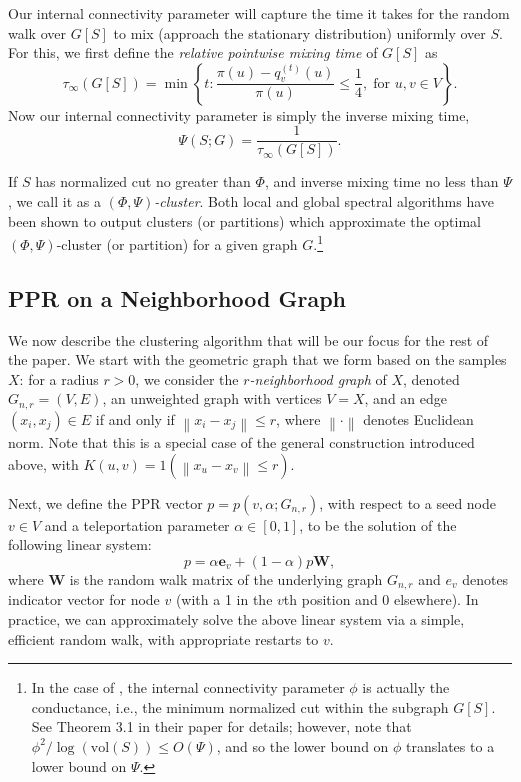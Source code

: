 \documentclass{article}
\newcommand{\set}[1]{\left\{#1\right\}}
\newcommand{\vol}{\mathrm{vol}}
\newcommand{\norm}[1]{\left\lVert#1\right\rVert}
\newcommand{\1}{\mathbf{1}}
\newcommand{\pbf}{p}        %
\newcommand{\qbf}{\mathbf{q}}
\newcommand{\ebf}[1]{\mathbf{e}_{#1}}
\newcommand{\Xbf}{X}             %
\newcommand{\Wbf}{\mathbf{W}}
\theoremstyle{aldenthm}
\theoremstyle{aldenrmrk}
\begin{document}
Our internal connectivity parameter will capture the time it takes for the
random walk over $G[S]$ to mix (approach the stationary distribution)
uniformly over $S$.  For this, we first define the \emph{relative pointwise mixing
  time} of $G[S]$ as 
$$
\tau_{\infty}(G[S]) = \min\set{ t: \frac{\pi(u) - q_{v}^{(t)}(u)
	}{\pi(u)} \leq \frac{1}{4}, 
	\; \text{for $u,v \in V$}}. 
$$
Now our internal connectivity parameter is simply the inverse mixing time, 
\begin{equation}
\label{eqn: inv_mixing_time}
\Psi(S; G) = \frac{1}{\tau_{\infty}(G[S])}.
\end{equation}

If $S$ has normalized cut no greater than $\Phi$, and inverse mixing time no
less than $\Psi$, we call it as a \emph{$(\Phi,\Psi)$-cluster}. Both
local \citep{zhu2013} and global \citep{kannan04} spectral algorithms have been
shown to output clusters (or partitions) which approximate the optimal $(\Phi,
\Psi)$-cluster (or partition) for a given graph $G$.\footnote{In the case of
  \citep{kannan04}, the internal connectivity parameter $\phi$ is actually the
  conductance, i.e., the minimum normalized cut within the subgraph $G[S]$. See
  Theorem 3.1 in their paper for details; however, note that $\phi^2 /
  \log(\vol(S)) \leq O(\Psi)$, and so the lower bound on $\phi$ translates to a
  lower bound on $\Psi$.}   

\subsection{PPR on a Neighborhood Graph}

We now describe the clustering algorithm that will be our focus for the rest of 
the paper. We start with the geometric graph that we form based on the samples 
$\Xbf$: for a radius $r > 0$, we consider the \emph{$r$-neighborhood graph} of 
$\Xbf$, denoted $G_{n,r}=(V,E)$, an unweighted graph with vertices
$V=\Xbf$, and an edge $(x_i,x_j) \in E$ if and only if $\norm{x_i - x_j}
\leq  r$, where $\norm{\cdot}$ denotes Euclidean norm.  Note that this is a
special case of the general construction introduced above, with 
$K(u,v) = 1(\norm{x_u - x_v} \leq r)$. 

Next, we define the PPR vector $\pbf = \pbf(v,\alpha;G_{n,r})$, with respect to  
a seed node $v \in V$ and a teleportation parameter $\alpha \in [0,1]$, to be
the solution of the following linear system:
\begin{equation}
\label{eqn: ppr_vector}
\pbf = \alpha \ebf{v} + (1 - \alpha) \pbf \Wbf,
\end{equation}
where $\Wbf$ is the random walk matrix of the underlying graph $G_{n,r}$ 
and $e_{v}$ denotes indicator vector for node $v$ (with a 1 in the $v$th
position and 0 elsewhere).  In practice, we can approximately solve the above
linear system via a simple, efficient random walk, with appropriate restarts to
$v$. 
\end{document}
